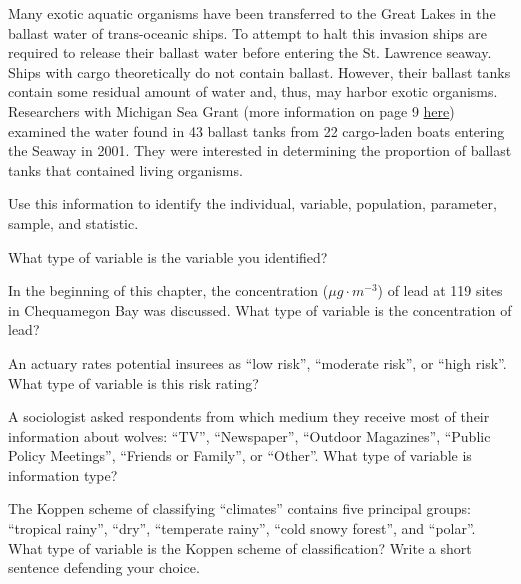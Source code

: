 \documentclass[10pt,openany]{book}\usepackage[]{graphicx}\usepackage[]{color}
\begin{document}
\begin{hwsection}
  \item \label{hwprob:IVPPSSWater} Many exotic aquatic organisms have been transferred to the Great Lakes in the ballast water of trans-oceanic ships.  To attempt to halt this invasion ships are required to release their ballast water before entering the St. Lawrence seaway.  Ships with cargo theoretically do not contain ballast.  However, their ballast tanks contain some residual amount of water and, thus, may harbor exotic organisms.  Researchers with Michigan Sea Grant (more information on page 9 \href{http://www.miseagrant.umich.edu/downloads/upwellings/sum02.pdf}{here}) examined the water found in 43 ballast tanks from 22 cargo-laden boats entering the Seaway in 2001.  They were interested in determining the proportion of ballast tanks that contained living organisms.
    \begin{Enumerate}
      \item Use this information to identify the individual, variable, population, parameter, sample, and statistic.
      \item What type of variable is the variable you identified?
    \end{Enumerate}

  \item \label{hwprob:VarTypeLead} In the beginning of this chapter, the concentration ($\mu g \cdot m^{-3}$) of lead at 119 sites in Chequamegon Bay was discussed.  What type of variable is the concentration of lead?

  \item \label{hwprob:VarTypeRisk} An actuary rates potential insurees as ``low risk'', ``moderate risk'', or ``high risk''.  What type of variable is this risk rating?

  \item \label{hwprob:VarTypeInfoType} A sociologist asked respondents from which medium they receive most of their information about wolves: ``TV'', ``Newspaper'', ``Outdoor Magazines'', ``Public Policy Meetings'', ``Friends or Family'', or ``Other''.  What type of variable is information type?

  \item \label{hwprob:VarTypeKoppen} The Koppen scheme of classifying ``climates'' contains five principal groups: ``tropical rainy'', ``dry'', ``temperate rainy'', ``cold snowy forest'', and ``polar''.  What type of variable is the Koppen scheme of classification?  Write a short sentence defending your choice.
\end{hwsection}
\end{document}
